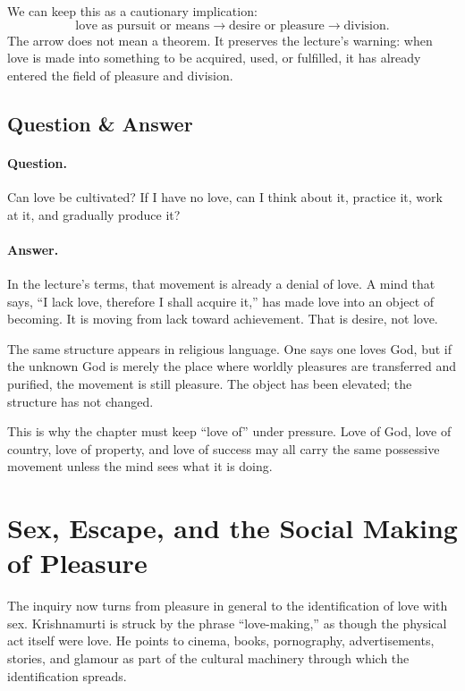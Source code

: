 We can keep this as a cautionary implication:
\begin{equation}
\text{love as pursuit or means}
\longrightarrow
\text{desire or pleasure}
\longrightarrow
\text{division}.
\end{equation}
The arrow does not mean a theorem. It preserves the lecture's warning: when love is made into something to be acquired, used, or fulfilled, it has already entered the field of pleasure and division.

\subsection{Question \& Answer}

\paragraph{Question.}
Can love be cultivated? If I have no love, can I think about it, practice it, work at it, and gradually produce it?

\paragraph{Answer.}
In the lecture's terms, that movement is already a denial of love. A mind that says, ``I lack love, therefore I shall acquire it,'' has made love into an object of becoming. It is moving from lack toward achievement. That is desire, not love.

The same structure appears in religious language. One says one loves God, but if the unknown God is merely the place where worldly pleasures are transferred and purified, the movement is still pleasure. The object has been elevated; the structure has not changed.

\begin{remark}
This is why the chapter must keep ``love of'' under pressure. Love of God, love of country, love of property, and love of success may all carry the same possessive movement unless the mind sees what it is doing.
\end{remark}

\section{Sex, Escape, and the Social Making of Pleasure}

The inquiry now turns from pleasure in general to the identification of love with sex. Krishnamurti is struck by the phrase ``love-making,'' as though the physical act itself were love. He points to cinema, books, pornography, advertisements, stories, and glamour as part of the cultural machinery through which the identification spreads.

